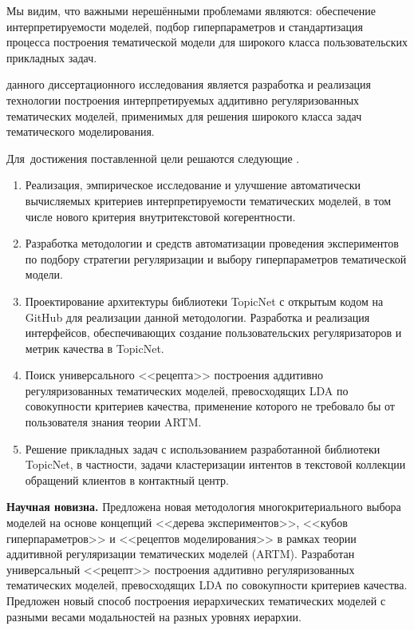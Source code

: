 Мы видим, что важными нерешёнными проблемами являются: обеспечение  интерпретируемости моделей, подбор гиперпараметров и стандартизация процесса построения тематической модели для широкого класса пользовательских прикладных задач. 

{\aim} данного диссертационного исследования является разработка и реализация технологии построения интерпретируемых аддитивно регуляризованных тематических моделей, применимых для решения широкого класса задач тематического моделирования.  

Для~достижения поставленной цели решаются следующие {\tasks}. 
\begin{enumerate}[beginpenalty=10000] %
  \item Реализация, эмпирическое исследование и улучшение автоматически вычисляемых критериев интерпретируемости тематических моделей, в том числе нового критерия внутритекстовой когерентности. 
  \item Разработка методологии и средств автоматизации проведения экспериментов по подбору стратегии регуляризации и выбору гиперпараметров тематической модели. 
  \item Проектирование архитектуры библиотеки TopicNet с открытым кодом на GitHub для реализации данной методологии. Разработка и реализация интерфейсов, обеспечивающих создание пользовательских регуляризаторов и метрик качества в TopicNet. 
  \item Поиск универсального <<рецепта>> построения аддитивно регуляризованных тематических моделей, превосходящих LDA по совокупности критериев качества, применение которого не требовало бы от пользователя знания теории ARTM. 
  \item Решение прикладных задач с использованием разработанной библиотеки TopicNet, в частности, задачи кластеризации интентов в текстовой коллекции обращений клиентов в контактный центр. 
\end{enumerate} 

\textbf{Научная новизна.}  
Предложена новая методология многокритериального выбора моделей на основе концепций <<дерева экспериментов>>, <<кубов гиперпараметров>> и <<рецептов моделирования>> в рамках теории аддитивной регуляризации тематических моделей (ARTM). 
Разработан универсальный <<рецепт>> построения аддитивно регуляризованных тематических моделей, превосходящих LDA по совокупности критериев качества. 
Предложен новый способ построения иерархических тематических моделей с разными весами модальностей на разных уровнях иерархии.  

